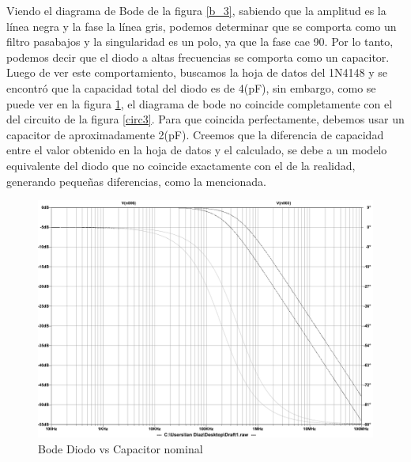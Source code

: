 Viendo el diagrama de Bode de la figura \ref{b_3}, sabiendo que la amplitud es
la l\'inea negra y la fase la l\'inea gris, podemos determinar que se
comporta como un filtro pasabajos y la singularidad es un polo, ya que la fase cae 90\textdegree .
Por lo tanto, podemos decir que el diodo a altas frecuencias se comporta
como un capacitor. Luego de ver este comportamiento, buscamos la hoja
de datos del 1N4148 y se encontr\'o que la capacidad total del diodo
es de 4(pF), sin embargo, como se puede ver en la figura \ref{b2_3},
el diagrama de bode no coincide completamente con el del circuito de la figura
\ref{circ3}. Para que coincida perfectamente, debemos usar un capacitor
de aproximadamente 2(pF). Creemos que la diferencia de capacidad entre
el valor obtenido en la hoja de datos y el calculado, se debe a un
modelo equivalente del diodo que no coincide exactamente con el
de la realidad, generando pequeñas diferencias, como la mencionada.

\begin{figure}[H]
\begin{centering}
\includegraphics[scale=0.2]{../EJ3/Bode2}
\par\end{centering}
\caption{Bode Diodo vs Capacitor nominal}
\label{b2_3}
\end{figure}










